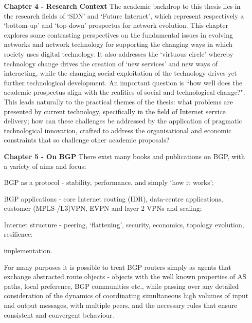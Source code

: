 \textbf{Chapter 4 - Research Context}
The academic backdrop to this thesis lies in the research fields of `SDN' and `Future Internet', which represent respectively a `bottom-up' and `top-down' prospectus for network evolution.
This chapter explores some contrasting perspectives on the fundamental issues in evolving networks and network technology for supporting the changing ways in which society uses digital technology. It also addresses the `virtuous circle' whereby technology change drives the creation of `new services' and new ways of interacting, while the changing social exploitation of the technology drives yet further technological development. An important question is ``how well does the academic prospectus align with the realities of social and technological change?".
This leads naturally to the practical themes of the thesis: what problems are presented by current technology, specifically in the field of Internet service delivery; how can these challenges be addressed by the application of pragmatic technological innovation, crafted to address the organisational and economic constraints that so challenge other academic proposals?

\textbf{Chapter 5 - On BGP}
There exist many books and publications on BGP, with a variety of aims and focus:
\begin{myitemize}
	\item BGP as a protocol - stability, performance, and simply `how it works';
	\item BGP applications - core Internet routing (IDR), data-centre applications, customer (MPLS-/L3)VPN, EVPN and layer 2 VPNs and scaling;
	\item Internet structure - peering, `flattening', security, economics, topology evolution, resilience;
	\item implementation.
\end{myitemize}

For many purposes it is possible to treat BGP routers simply as agents that exchange abstracted route objects - objects with the well known properties of AS paths, local preference, BGP communities etc., while passing over any detailed consideration of the dynamics of coordinating simultaneous high volumes of input and output messages, with multiple peers, and the necessary rules that ensure consistent and convergent behaviour.

